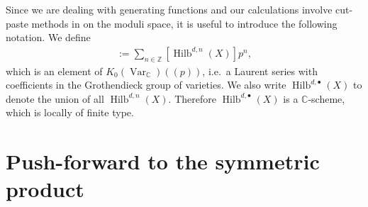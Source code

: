 \documentclass{amsart}
\theoremstyle{definition}
\newcommand{\CC} {\mathbb{C}}          %
\newcommand{\ZZ} {\mathbb{Z}}		%
\newcommand{\Hilb}{\operatorname{Hilb}}
\newcommand{\Var}{\operatorname{Var}}
\begin{document}
Since we are dealing with generating functions and our calculations involve cut-paste methods in on the moduli space, it is useful to introduce the following notation. We define
\begin{align*}
[\Hilb^{d,\bullet}(X)] := \sum_{n \in \ZZ} [\Hilb^{d,n}(X)] p^n,
\end{align*}
which is an element of $K_0(\Var_{\CC})(\!(p)\!)$, i.e.~a Laurent series with coefficients in the Grothendieck group of varieties. We also write $\Hilb^{d,\bullet}(X)$ to denote the union of all $\Hilb^{d,n}(X)$. Therefore $\Hilb^{d,\bullet}(X)$ is a $\CC$-scheme, which is locally of finite type.


\section{Push-forward to the symmetric product} \label{sym}
\end{document}
